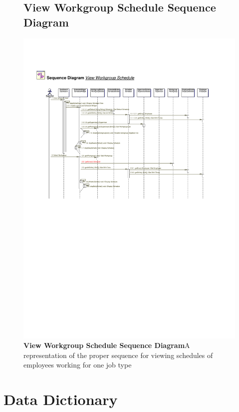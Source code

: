 \documentclass[letterpaper,12pt]{report}
\begin{document}
\begin{figure}[hbp]
 \section{View Workgroup Schedule Sequence Diagram}
 \includegraphics[scale=0.65]{externals/SequenceDiagrams17.pdf}
 \caption{\small
\textbf{View Workgroup Schedule Sequence Diagram}\newline A representation of the proper sequence for viewing schedules of employees working for one job type}\label{fig:seqViewWorkgroup}
\end{figure}
\newpage

\chapter{Data Dictionary}
\newpage
\end{document}
